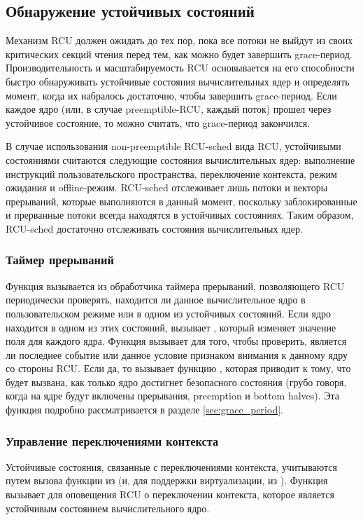 \subsection{Обнаружение устойчивых состояний} \label{sec:quiescent_state}
Механизм RCU должен ожидать до тех пор,
пока все потоки не выйдут из своих критических секций чтения перед тем,
как можно будет завершить grace-период.
Производительность и масштабируемость RCU
основывается на его способности быстро обнаруживать
устойчивые состояния вычислительных ядер и определять
момент, когда их набралось достаточно, чтобы завершить
grace-период.
Если каждое ядро (или, в случае preemptible-RCU, каждый поток)
прошел через устойчивое состояние, то можно считать,
что grace-период закончился.

В случае использования non-preemptible RCU-sched вида RCU,
устойчивыми состояниями считаются следующие состояния вычислительных ядер:
выполнение инструкций пользовательского пространства,
переключение контекста, режим ожидания и offline-режим.
RCU-sched отслеживает лишь потоки и векторы прерываний,
которые выполняются в данный момент,
поскольку заблокированные и прерванные потоки всегда находятся в
устойчивых состояниях.
Таким образом, RCU-sched достаточно отслеживать состояния вычислительных ядер.

\subsubsection{Таймер прерываний} \label{sec:timer_interrupt}
Функция  вызывается из обработчика таймера прерываний,
позволяющего RCU периодически проверять, находится ли данное вычислительное
ядро в пользовательском режиме или в одном из устойчивых состояний.
Если ядро находится в одном из этих состояний,
 вызывает ,
который изменяет значение поля  для
каждого ядра.
Функция  вызывает 
для того, чтобы проверить, является ли последнее событие или данное условие
признаком внимания к данному ядру со стороны RCU.
Если да, то  вызывает функцию ,
которая приводит к тому, что  будет вызвана,
как только ядро достигнет безопасного состояния
(грубо говоря, когда на ядре будут включены прерывания,
preemption и bottom halves).
Эта функция подробно рассматривается в разделе \ref{sec:grace_period}.

\subsubsection{Управление переключениями контекста} \label{sec:context_switch}
Устойчивые состояния, связанные с переключениями контекста,
учитываются путем вызова функции  из
(и, для поддержки виртуализации,
из ).
Функция  вызывает 
для оповещения RCU о переключении контекста, которое является устойчивым
состоянием вычислительного ядро.
